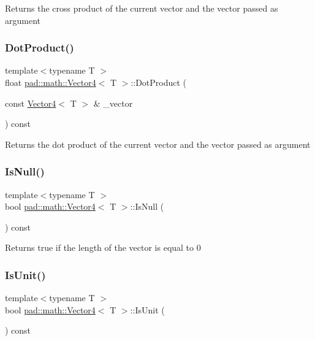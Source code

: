 Returns the cross product of the current vector and the vector passed as argument \mbox{\label{structpad_1_1math_1_1_vector4_aa2bc23659e5331ea63c4135ff4ba0cc5}} 
\subsubsection{\texorpdfstring{Dot\+Product()}{DotProduct()}}
{\footnotesize\ttfamily template$<$typename T $>$ \\
float \mbox{\hyperlink{structpad_1_1math_1_1_vector4}{pad\+::math\+::\+Vector4}}$<$ T $>$\+::Dot\+Product (\begin{DoxyParamCaption}\item[{const \mbox{\hyperlink{structpad_1_1math_1_1_vector4}{Vector4}}$<$ T $>$ \&}]{\+\_\+vector }\end{DoxyParamCaption}) const}

Returns the dot product of the current vector and the vector passed as argument \mbox{\label{structpad_1_1math_1_1_vector4_a60b73d235abc2a5948dccbe786de338f}} 
\subsubsection{\texorpdfstring{Is\+Null()}{IsNull()}}
{\footnotesize\ttfamily template$<$typename T $>$ \\
bool \mbox{\hyperlink{structpad_1_1math_1_1_vector4}{pad\+::math\+::\+Vector4}}$<$ T $>$\+::Is\+Null (\begin{DoxyParamCaption}{ }\end{DoxyParamCaption}) const}

Returns true if the length of the vector is equal to 0 \mbox{\label{structpad_1_1math_1_1_vector4_a194b228f5e0d3d8171daaa78927a7bd3}} 
\subsubsection{\texorpdfstring{Is\+Unit()}{IsUnit()}}
{\footnotesize\ttfamily template$<$typename T $>$ \\
bool \mbox{\hyperlink{structpad_1_1math_1_1_vector4}{pad\+::math\+::\+Vector4}}$<$ T $>$\+::Is\+Unit (\begin{DoxyParamCaption}{ }\end{DoxyParamCaption}) const}

